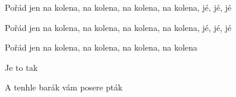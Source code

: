 \begin{song}
\bigskip

Pořád jen na kolena, na kolena, na kolena, na kolena, jé, jé, jé \par
Pořád jen na kolena, na kolena, na kolena, na kolena, jé, jé, jé \par
Pořád jen na kolena, na kolena, na kolena, na kolena \par
{} Je to tak \par
A tenhle barák vám posere pták \par

\bigskip


\end{song}